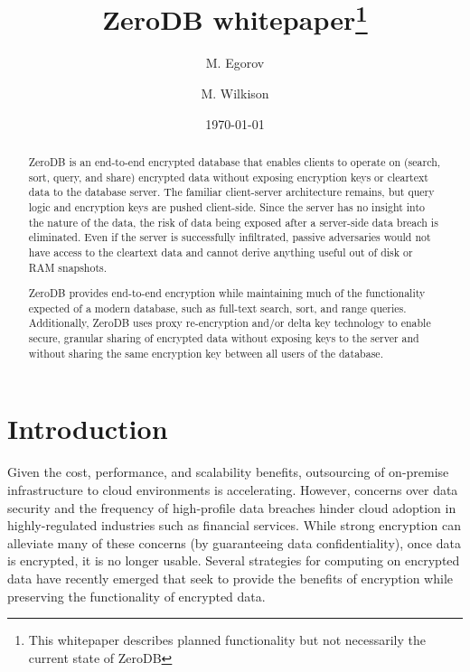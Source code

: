 \documentclass[notitlepage,longbibliography]{revtex4-1}
\begin{document}
\title{ZeroDB whitepaper\footnote{This whitepaper describes planned functionality but not necessarily the current state of ZeroDB}}

\author{M. Egorov}
\author{M. Wilkison}

\begin{abstract}
ZeroDB is an end-to-end encrypted database that enables clients to operate on (search, sort, query, and share) encrypted data without exposing encryption keys or cleartext data to the database server.
The familiar client-server architecture remains, but query logic and encryption keys are pushed client-side.
Since the server has no insight into the nature of the data, the risk of data being exposed after a server-side data breach is eliminated.
Even if the server is successfully infiltrated, passive adversaries would not have access to the cleartext data and
cannot derive anything useful out of disk or RAM snapshots.

ZeroDB provides end-to-end encryption while maintaining much of the functionality expected of a modern database, such as full-text search, sort, and range queries.
Additionally, ZeroDB uses proxy re-encryption and/or delta key technology to enable secure, granular sharing of encrypted data without exposing keys to the server and without sharing the same encryption key between all users of the database.
\end{abstract}

\date{\today}
\maketitle

\section{Introduction}

Given the cost, performance, and scalability benefits, outsourcing of on-premise infrastructure to cloud environments is accelerating.
However, concerns over data security and the frequency of high-profile data breaches hinder cloud adoption in highly-regulated industries such as financial services.
While strong encryption can alleviate many of these concerns (by guaranteeing data confidentiality), once data is encrypted, it is no longer usable.
Several strategies for computing on encrypted data have recently emerged that seek to provide the benefits of encryption while preserving the functionality of encrypted data.
\end{document}
